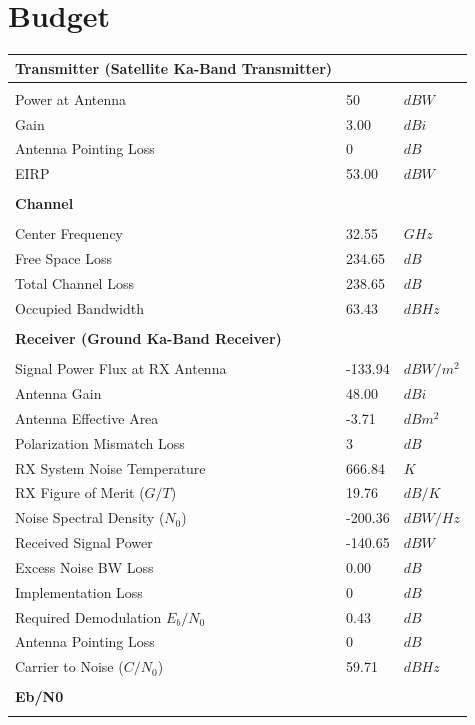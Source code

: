 \documentclass{article}
\begin{document}
\section{Budget}
\label{section::budget}
\begin{center}
  \begin{tabular}{p{3in}p{1in}l}
\textbf{Transmitter (Satellite Ka-Band Transmitter)} & & \\
\hline \\
Power at Antenna & 50 & $dBW$ \\
Gain & 3.00 & $dBi$ \\
Antenna Pointing Loss & 0 & $dB$ \\
EIRP & 53.00 & $dBW$ \\
\\
\textbf{Channel} & & \\
\hline \\
Center Frequency & 32.55 & $GHz$ \\
Free Space Loss & 234.65 & $dB$ \\
Total Channel Loss & 238.65 & $dB$ \\
Occupied Bandwidth & 63.43 & $dBHz$ \\
\\
\textbf{Receiver (Ground Ka-Band Receiver)} & & \\
\hline \\
Signal Power Flux at RX Antenna & -133.94 & $dBW/m^2$ \\
Antenna Gain & 48.00 & $dBi$ \\
Antenna Effective Area & -3.71 & $dBm^2$ \\
Polarization Mismatch Loss & 3 & $dB$ \\
RX System Noise Temperature & 666.84 & $K$ \\
RX Figure of Merit ($G/T$) & 19.76 & $dB/K$ \\
Noise Spectral Density ($N_0$) & -200.36 & $dBW/Hz$ \\
Received Signal Power & -140.65 & $dBW$ \\
Excess Noise BW Loss & 0.00 & $dB$ \\
Implementation Loss & 0 & $dB$ \\
Required Demodulation $E_b/N_0$ & 0.43 & $dB$ \\
Antenna Pointing Loss & 0 & $dB$ \\
Carrier to Noise ($C/N_0$) & 59.71 & $dBHz$ \\
\\
\textbf{Eb/N0} & & \\
\hline \\

\end{tabular}
\end{center}
\end{document}
